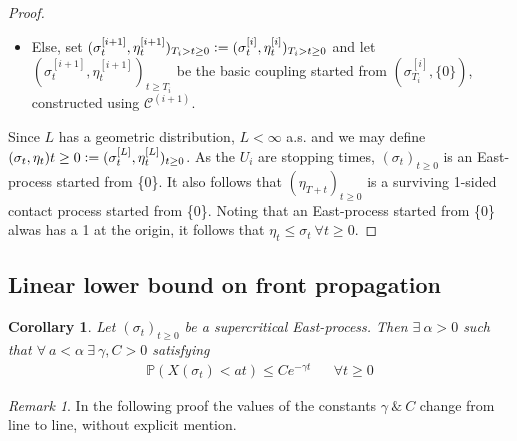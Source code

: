 \documentclass{article}
\theoremstyle{slimTheoremStyle} %
\newtheorem{corollary}{Corollary}[theorem]
\theoremstyle{slimDefinitionStyle}
\theoremstyle{remark}
\newtheorem{remark}{Remark}[section]
\renewcommand{\cal}[1]{\mathcal{#1}}
\renewcommand{\Pr}[1]{\mathbb{P} \left( #1 \right)}
\newcommand{\defeq}{\vcentcolon=}
\begin{document}
\begin{proof}
\begin{enumerate}
\begin{itemize}
    \item Else, set $(\sigma^{[i+1]}_t, \eta^{[i+1]}_t)_{T_i > t \geq 0} \defeq (\sigma^{[i]}_t, \eta^{[i]}_t)_{T_i > t \geq 0}$ and let $(\sigma^{[i+1]}_t, \eta^{[i+1]}_t)_{t \geq T_i}$ be the basic coupling started from $(\sigma^{[i]}_{T_i}, \{0\})$, constructed using $\cal{C}^{(i+1)}$. 
  \end{itemize}
\end{enumerate}
Since $L$ has a geometric distribution, $L < \infty$ a.s. and we may define $(\sigma_t, \eta_t){t \geq 0} \defeq (\sigma^{[L]}_t, \eta^{[L]}_t)_{t \geq 0}$. As the $U_i$ are stopping times, $(\sigma_t)_{t \geq 0}$ is an East-process started from \{0\}. It also follows that $(\eta_{T+t})_{t \geq 0}$ is a surviving 1-sided contact process started from \{0\}. Noting that an East-process started from \{0\} alwas has a 1 at the origin, it follows that $\eta_t \leq \sigma_t\ \forall t \geq 0$. 
\end{proof}

\subsection{Linear lower bound on front propagation}

\begin{corollary}\label{cor:lower_linear_speed}
Let $(\sigma_t)_{t \geq 0}$ be a supercritical East-process. Then $\exists\ \alpha > 0$ such that $\forall\ a < \alpha\ \exists\ \gamma, C > 0$ satisfying 
\begin{align}
\Pr{X(\sigma_t) < at} \leq C e^{-\gamma t} && \forall t \geq 0
\end{align}
\end{corollary}

\begin{remark}
In the following proof the values of the constants $\gamma\ \&\ C$ change from line to line, without explicit mention. 
\end{remark}
\end{document}

